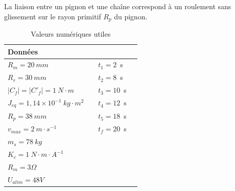 %
%
La liaison entre un pignon et une chaîne correspond à un roulement sans glissement sur le rayon primitif $R_p$ du pignon.


%
%
%
%
%

\begin{table}[!ht]
\begin{center}
\renewcommand{\arraystretch}{1.3}
\begin{tabular}{|ll|ll|}
  \hline
  \multicolumn{4}{|l|}{\textbf{Données}} \\
  \hline
  $R_m = 20~mm$         & & $t_1 = 2$~s & \\
  $R_r = 30~mm$         & & $t_2 = 8$~s & \\
  $|C_f| = |C'_f| = 1~N\cdot m$   & & $t_3 = 10$~s & \\
  $J_{eq} = 1{,}14 \times 10^{-1}~kg\cdot m^2$ & & $t_4 = 12$~s  & \\
  $R_p = 38~mm$                & &  $t_5 = 18$~s & \\
  $v_{max} = 2~m\cdot s^{-1}$   & & $t_f = 20$~s & \\
  $m_s = 78~kg$                & & & \\
  $K_c=1~N\cdot m\cdot A^{-1}$ & & & \\
  $R_m=3\Omega$ & & & \\
  $U_{alim}=48V$ & & & \\
  \hline
\end{tabular}
\end{center}
\caption{\label{tab03}Valeurs numériques utiles}
\end{table}

